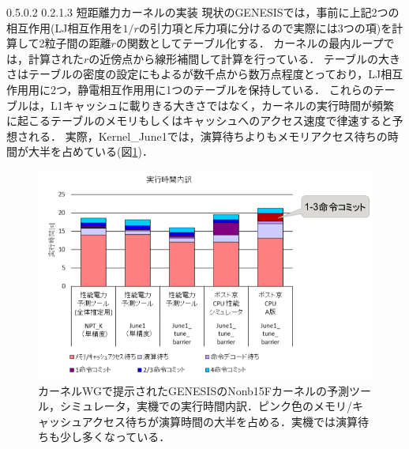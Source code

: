 \documentclass[uplatex,11pt,a4j,titlepage,oneside,openright,dvipdfmx]{jsbook}
\makeatletter
\renewcommand{\section}{%
   \@startsection{section}{1}{\z@}%
   {0.5\Cvs \@plus.0\Cdp \@minus.2\Cdp}%
   {0.2\Cvs \@plus.1\Cdp \@minus.3\Cdp}%
   {\reset@font\large\bfseries}}%
\makeatother
\begin{document}
 \section{短距離力カーネルの実装}
 現状のGENESISでは，事前に上記2つの相互作用(LJ相互作用を$1/r$の引力項と斥力項に分けるので実際には3つの項)を計算して2粒子間の距離$r$の関数としてテーブル化する．
 カーネルの最内ループでは，計算された$r$の近傍点から線形補間して計算を行っている．
 テーブルの大きさはテーブルの密度の設定にもよるが数千点から数万点程度とっており，LJ相互作用用に2つ，静電相互作用用に1つのテーブルを保持している．
 これらのテーブルは，L1キャッシュに載りきる大きさではなく，カーネルの実行時間が頻繁に起こるテーブルのメモリもしくはキャッシュへのアクセス速度で律速すると予想される．
 実際，Kernel\_June1では，演算待ちよりもメモリアクセス待ちの時間が大半を占めている(図\ref{fig:genesis_profile})．

 \begin{figure}
 \centering
 \includegraphics[bb=0 0 734 457, width=12.0cm]{figure/genesis_profile.png}
 \caption[]{カーネルWGで提示されたGENESISのNonb15Fカーネルの予測ツール，シミュレータ，実機での実行時間内訳．ピンク色のメモリ/キャッシュアクセス待ちが演算時間の大半を占める．実機では演算待ちも少し多くなっている．}
 \label{fig:genesis_profile}
 \end{figure}
\end{document}
